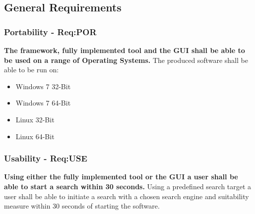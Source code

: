 \subsection{General Requirements}
\subsubsection{Portability - Req:POR}
\label{sec:reqpor}
\textbf{The framework, fully implemented tool and the GUI shall be able to be used on a range of Operating Systems.}
The produced software shall be able to be run on:
\begin{itemize}
 \item Windows 7 32-Bit
 \item Windows 7 64-Bit
 \item Linux 32-Bit
 \item Linux 64-Bit
\end{itemize}

\subsubsection{Usability - Req:USE}
\label{sec:requse}
\textbf{Using either the fully implemented tool or the GUI a user shall be able to start a search within 30 seconds.}
Using a predefined search target a user shall be able to initiate a search with a chosen search engine and suitability measure within 30 seconds of starting the software.